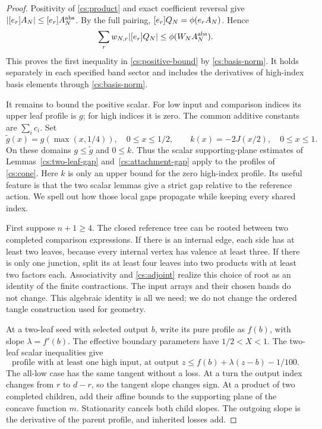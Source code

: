 \begin{proof}
Positivity of \eqref{cs:product} and exact coefficient reversal give
\(|[e_{r}]A_N|\le[e_{r}]A_N^{\mathrm{abs}}\).
By the full pairing,
\([e_{r}]Q_N=\phi(e_r A_N)\). Hence
\begin{equation}\label{cs:positive-mass}
 \sum_r w_{N,r}|[e_{r}]Q_N|
      \le\phi(W_N A_N^{\mathrm{abs}}).
\end{equation}
This proves the first inequality in \eqref{cs:positive-bound} by
\eqref{cs:basis-norm}. It holds separately in each specified band
sector and includes the derivatives of high-index basis elements through \eqref{cs:basis-norm}.

It remains to bound the positive scalar. For low input and comparison
indices its upper leaf profile is \(g\); for high indices it is zero.
The common additive constants are \(\sum_i c_i\). Set
\[
 \widetilde g(x)=g(\max(x,1/4)),\quad 0\le x\le1/2,
 \qquad k(x)=-2J(x/2),\quad 0\le x\le1.
\]
On these domains \(g\le\widetilde g\) and \(0\le k\).
Thus the scalar supporting-plane estimates of
Lemmas~\ref{cs:two-leaf-gap} and~\ref{cs:attachment-gap} apply to the profiles of
\eqref{cs:cone}. Here $k$ is only an upper bound for the zero high-index profile.
Its useful feature is that the two scalar lemmas give a strict gap
relative to the reference action. We spell out how those local gaps
propagate while keeping every shared index.

First suppose \(n+1\ge4\). The closed reference tree can be rooted between two completed comparison expressions. If there is an internal
edge, each side has at least two leaves, because every internal vertex
has valence at least three. If there is only one junction, split its
at least four leaves into two products with at least two factors each.
Associativity and \eqref{cs:adjoint} realize this choice of root as
an identity of the finite contractions. The input arrays and their
chosen bands do not change. This algebraic identity is all we need;
we do not change the ordered tangle construction used for geometry.

At a two-leaf seed with selected output \(b\), write its pure profile
as \(f(b)\), with slope \(\lambda=f'(b)\). The effective boundary
parameters have \(1/2<X<1\). The two-leaf scalar inequalities give
\begin{equation}\label{cs:seed-affine}
 \text{profile with at least one high input, at output }z
       \le f(b)+\lambda(z-b)-1/100.
\end{equation}
The all-low case has the same tangent without a loss. At a turn the
output index changes from \(r\) to \(d-r\), so the tangent slope
changes sign. At a product of two completed children, add their affine
bounds to the supporting plane of the concave function \(m\).
Stationarity cancels both child slopes. The outgoing slope is the
derivative of the parent profile, and inherited losses add.


\end{proof}
